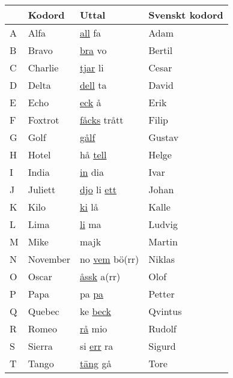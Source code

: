 \begin{table}[htbp]
  \small
  \begin{tabular}{llll}
      & Kodord     & Uttal                                 & Svenskt kodord  \\ \hline
    A & Alfa       & \underline{all} fa                    & Adam            \\
    B & Bravo      & \underline{bra} vo                    & Bertil           \\
    C & Charlie    & \underline{tjar} li                   & Cesar          \\
    D & Delta      & \underline{dell} ta                   & David           \\
    E & Echo       & \underline{eck} å                     & Erik            \\
    F & Foxtrot    & \underline{fåcks} trått               & Filip           \\
    G & Golf       & \underline{gålf}                      & Gustav          \\
    H & Hotel      & hå \underline{tell}                   & Helge           \\
    I & India      & \underline{in} dia                    & Ivar            \\
    J & Juliett    & \underline{djo} li \underline{ett}    & Johan           \\
    K & Kilo       & \underline{ki} lå                     & Kalle           \\
    L & Lima       & \underline{li} ma                     & Ludvig          \\
    M & Mike       & majk                                  & Martin          \\
    N & November   & no \underline{vem} bö(rr)             & Niklas          \\
    O & Oscar      & \underline{åssk} a(rr)                & Olof            \\
    P & Papa       & pa \underline{pa}                     & Petter          \\
    Q & Quebec     & ke \underline{beck}                   & Qvintus         \\
    R & Romeo      & \underline{rå} mio                    & Rudolf          \\
    S & Sierra     & si \underline{err} ra                 & Sigurd          \\
    T & Tango      & \underline{täng} gå                   & Tore            \\

\end{tabular}
\end{table}
